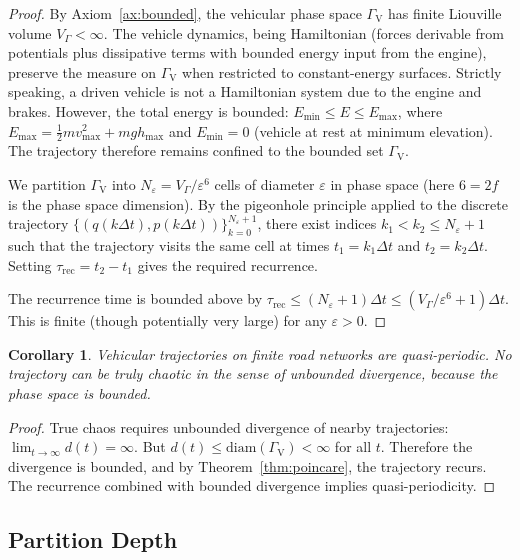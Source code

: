 \documentclass[twocolumn,10pt]{article}
\newtheorem{corollary}[theorem]{Corollary}
\newcommand{\GammaV}{\Gamma_{\mathrm{V}}}
\newcommand{\VGamma}{V_{\Gamma}}
\newcommand{\vmax}{v_{\mathrm{max}}}
\newcommand{\trec}{\tau_{\mathrm{rec}}}
\newcommand{\Emax}{E_{\mathrm{max}}}
\newcommand{\Emin}{E_{\mathrm{min}}}
\begin{document}
\begin{proof}
By Axiom~\ref{ax:bounded}, the vehicular phase space $\GammaV$ has finite Liouville volume $\VGamma < \infty$. The vehicle dynamics, being Hamiltonian (forces derivable from potentials plus dissipative terms with bounded energy input from the engine), preserve the measure on $\GammaV$ when restricted to constant-energy surfaces. Strictly speaking, a driven vehicle is not a Hamiltonian system due to the engine and brakes. However, the total energy is bounded: $\Emin \leq E \leq \Emax$, where $\Emax = \frac{1}{2}m\vmax^2 + mgh_{\mathrm{max}}$ and $\Emin = 0$ (vehicle at rest at minimum elevation). The trajectory therefore remains confined to the bounded set $\GammaV$.

We partition $\GammaV$ into $N_{\varepsilon} = \VGamma / \varepsilon^{6}$ cells of diameter $\varepsilon$ in phase space (here $6 = 2f$ is the phase space dimension). By the pigeonhole principle applied to the discrete trajectory $\{(q(k\Delta t), p(k\Delta t))\}_{k=0}^{N_{\varepsilon}+1}$, there exist indices $k_1 < k_2 \leq N_{\varepsilon} + 1$ such that the trajectory visits the same cell at times $t_1 = k_1 \Delta t$ and $t_2 = k_2 \Delta t$. Setting $\trec = t_2 - t_1$ gives the required recurrence.

The recurrence time is bounded above by $\trec \leq (N_{\varepsilon} + 1)\Delta t \leq (\VGamma / \varepsilon^{6} + 1)\Delta t$. This is finite (though potentially very large) for any $\varepsilon > 0$.
\end{proof}

\begin{corollary}
Vehicular trajectories on finite road networks are quasi-periodic. No trajectory can be truly chaotic in the sense of unbounded divergence, because the phase space is bounded.
\end{corollary}

\begin{proof}
True chaos requires unbounded divergence of nearby trajectories: $\lim_{t \to \infty} d(t) = \infty$. But $d(t) \leq \mathrm{diam}(\GammaV) < \infty$ for all $t$. Therefore the divergence is bounded, and by Theorem~\ref{thm:poincare}, the trajectory recurs. The recurrence combined with bounded divergence implies quasi-periodicity.
\end{proof}

\subsection{Partition Depth}
\end{document}
